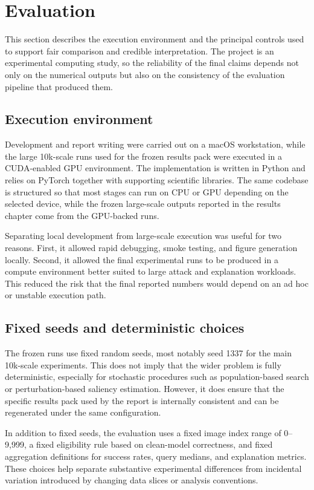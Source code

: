 \section{Evaluation}
\label{sec:experimental_setup}

This section describes the execution environment and the principal controls used to support fair comparison and credible interpretation.
The project is an experimental computing study, so the reliability of the final claims depends not only on the numerical outputs but also on the consistency of the evaluation pipeline that produced them.

\subsection{Execution environment}
Development and report writing were carried out on a macOS workstation, while the large 10k-scale runs used for the frozen results pack were executed in a CUDA-enabled GPU environment.
The implementation is written in Python and relies on PyTorch together with supporting scientific libraries.
The same codebase is structured so that most stages can run on CPU or GPU depending on the selected device, while the frozen large-scale outputs reported in the results chapter come from the GPU-backed runs.

Separating local development from large-scale execution was useful for two reasons.
First, it allowed rapid debugging, smoke testing, and figure generation locally.
Second, it allowed the final experimental runs to be produced in a compute environment better suited to large attack and explanation workloads.
This reduced the risk that the final reported numbers would depend on an ad hoc or unstable execution path.

\subsection{Fixed seeds and deterministic choices}
The frozen runs use fixed random seeds, most notably seed 1337 for the main 10k-scale experiments.
This does not imply that the wider problem is fully deterministic, especially for stochastic procedures such as population-based search or perturbation-based saliency estimation.
However, it does ensure that the specific results pack used by the report is internally consistent and can be regenerated under the same configuration.

In addition to fixed seeds, the evaluation uses a fixed image index range of 0--9{,}999, a fixed eligibility rule based on clean-model correctness, and fixed aggregation definitions for success rates, query medians, and explanation metrics.
These choices help separate substantive experimental differences from incidental variation introduced by changing data slices or analysis conventions.

